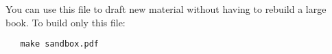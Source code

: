 

You can use this file to draft new material without having to rebuild a large book. To build only this file:

\begin{verbatim}
   make sandbox.pdf
\end{verbatim}




